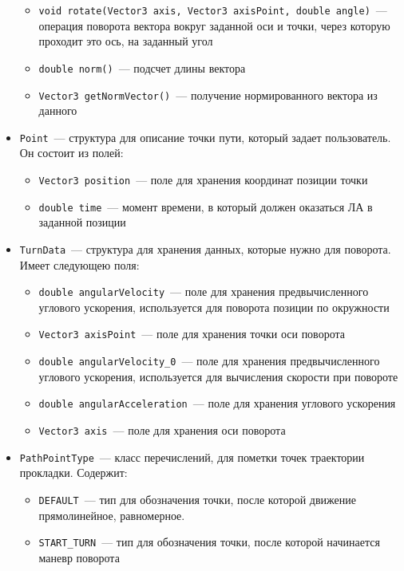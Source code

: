 \documentclass[a4paper,12pt]{article}
\numberwithin{figure}{subsubsection}
\begin{document}
\begin{itemize}
\begin{itemize}
        \item \texttt{void rotate(Vector3 axis, Vector3 axisPoint, double angle)}~--- операция поворота вектора вокруг заданной оси и точки, через которую проходит это ось, на заданный угол
        \item \texttt{double norm()}~--- подсчет длины вектора
        \item \texttt{Vector3 getNormVector()}~--- получение нормированного вектора из данного
    \end{itemize}
    \item \texttt{Point}~--- структура для описание точки пути, который задает пользователь. Он состоит из полей:
    \begin{itemize}
        \item \texttt{Vector3 position}~--- поле для хранения координат позиции точки
        \item \texttt{double time}~--- момент времени, в который должен оказаться ЛА в заданной позиции
    \end{itemize}
    \item \texttt{TurnData}~--- структура для хранения данных, которые нужно для поворота. Имеет следующею поля:
    \begin{itemize}
        \item \texttt{double angularVelocity}~--- поле для хранения предвычисленного углового ускорения, используется для поворота позиции по окружности
        \item \texttt{Vector3 axisPoint}~--- поле для хранения точки оси поворота
        \item \texttt{double angularVelocity\_0}~--- поле для хранения предвычисленного углового ускорения, используется для вычисления скорости при повороте
        \item \texttt{double angularAcceleration}~--- поле для хранения углового ускорения
        \item \texttt{Vector3 axis}~--- поле для хранения оси поворота
    \end{itemize}
    \item \texttt{PathPointType}~--- класс перечислений, для пометки точек траектории прокладки. Содержит:
        \begin{itemize}
            \item \texttt{DEFAULT}~--- тип для обозначения точки, после которой движение прямолинейное, равномерное.
            \item \texttt{START\_TURN}~--- тип для обозначения точки, после которой начинается маневр поворота 

\end{itemize}
\end{itemize}
\end{document}
